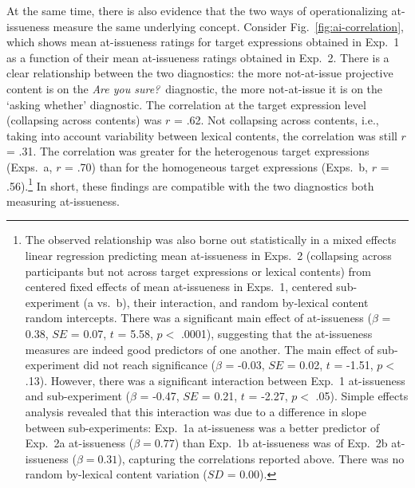 \documentclass[11pt,fleqn]{article}
\newcommand{\6}{\mbox{$[\hspace*{-.6mm}[$}}
\newcommand{\9}{\mbox{$]\hspace*{-.6mm}]$}}
\newcommand{\figref}[1]{Fig.~\ref{#1}}
\begin{document}
At the same time, there is also evidence that the two ways of operationalizing at-issueness measure the same underlying concept. Consider \figref{fig:ai-correlation}, which shows mean at-issueness ratings for target expressions obtained in Exp.~1 as a function of their mean at-issueness ratings obtained in Exp.~2. There is a clear relationship between the two diagnostics: the more not-at-issue projective content is on the {\em Are you sure?}~diagnostic, the more not-at-issue it is on the `asking whether' diagnostic. The correlation at the target expression level (collapsing across contents) was $r$ = .62. Not collapsing across contents, i.e., taking into account variability between lexical contents, the correlation was still $r$ = .31. The correlation was greater for the heterogenous target expressions (Exps.~a, $r$ = .70) than for the homogeneous target expressions (Exps.~b, $r$ = .56).\footnote{The observed relationship was also borne out statistically in a mixed effects linear regression predicting mean at-issueness in Exps.~2 (collapsing across participants but not across target expressions or lexical contents) from centered fixed effects of mean at-issueness in Exps.~1, centered sub-experiment (a vs.~b), their interaction, and random by-lexical content random intercepts. There was a significant main effect of at-issueness ($\beta$ = 0.38, $SE$ = 0.07, $t$ = 5.58, $p <$ .0001), suggesting that the at-issueness measures are indeed good predictors of one another. The main effect of sub-experiment did not reach significance  ($\beta$ = -0.03, $SE$ = 0.02, $t$ = -1.51, $p <$ .13). However, there was a significant interaction between Exp.~1 at-issueness and sub-experiment ($\beta$ = -0.47, $SE$ = 0.21, $t$ = -2.27, $p <$ .05). Simple effects analysis revealed that this interaction was due to a difference in slope between sub-experiments: Exp.~1a at-issueness was a better predictor of Exp.~2a at-issueness ($\beta = 0.77$) than Exp.~1b at-issueness was of Exp.~2b at-issueness ($\beta = 0.31$), capturing the correlations reported above. There was no random by-lexical content variation  ($SD$ = 0.00).} In short, these findings are compatible with the two diagnostics both measuring at-issueness.
\end{document}
